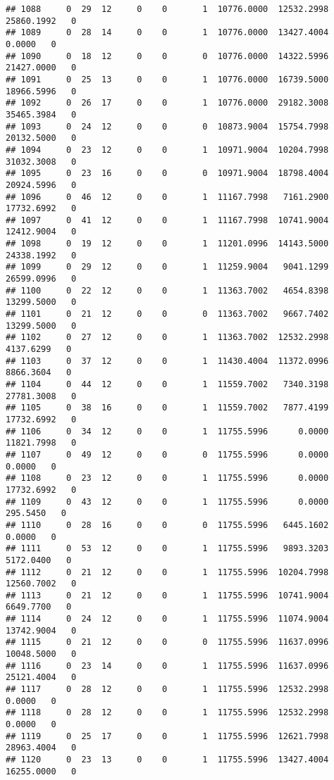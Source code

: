\documentclass[
]{article}
\begin{document}
\begin{enumerate}
\begin{verbatim}
## 1088     0  29  12     0    0       1  10776.0000  12532.2998  25860.1992   0
## 1089     0  28  14     0    0       1  10776.0000  13427.4004      0.0000   0
## 1090     0  18  12     0    0       0  10776.0000  14322.5996  21427.0000   0
## 1091     0  25  13     0    0       1  10776.0000  16739.5000  18966.5996   0
## 1092     0  26  17     0    0       1  10776.0000  29182.3008  35465.3984   0
## 1093     0  24  12     0    0       0  10873.9004  15754.7998  20132.5000   0
## 1094     0  23  12     0    0       1  10971.9004  10204.7998  31032.3008   0
## 1095     0  23  16     0    0       0  10971.9004  18798.4004  20924.5996   0
## 1096     0  46  12     0    0       1  11167.7998   7161.2900  17732.6992   0
## 1097     0  41  12     0    0       1  11167.7998  10741.9004  12412.9004   0
## 1098     0  19  12     0    0       1  11201.0996  14143.5000  24338.1992   0
## 1099     0  29  12     0    0       1  11259.9004   9041.1299  26599.0996   0
## 1100     0  22  12     0    0       1  11363.7002   4654.8398  13299.5000   0
## 1101     0  21  12     0    0       0  11363.7002   9667.7402  13299.5000   0
## 1102     0  27  12     0    0       1  11363.7002  12532.2998   4137.6299   0
## 1103     0  37  12     0    0       1  11430.4004  11372.0996   8866.3604   0
## 1104     0  44  12     0    0       1  11559.7002   7340.3198  27781.3008   0
## 1105     0  38  16     0    0       1  11559.7002   7877.4199  17732.6992   0
## 1106     0  34  12     0    0       1  11755.5996      0.0000  11821.7998   0
## 1107     0  49  12     0    0       0  11755.5996      0.0000      0.0000   0
## 1108     0  23  12     0    0       1  11755.5996      0.0000  17732.6992   0
## 1109     0  43  12     0    0       1  11755.5996      0.0000    295.5450   0
## 1110     0  28  16     0    0       0  11755.5996   6445.1602      0.0000   0
## 1111     0  53  12     0    0       1  11755.5996   9893.3203   5172.0400   0
## 1112     0  21  12     0    0       1  11755.5996  10204.7998  12560.7002   0
## 1113     0  21  12     0    0       1  11755.5996  10741.9004   6649.7700   0
## 1114     0  24  12     0    0       1  11755.5996  11074.9004  13742.9004   0
## 1115     0  21  12     0    0       0  11755.5996  11637.0996  10048.5000   0
## 1116     0  23  14     0    0       1  11755.5996  11637.0996  25121.4004   0
## 1117     0  28  12     0    0       1  11755.5996  12532.2998      0.0000   0
## 1118     0  28  12     0    0       1  11755.5996  12532.2998      0.0000   0
## 1119     0  25  17     0    0       1  11755.5996  12621.7998  28963.4004   0
## 1120     0  23  13     0    0       1  11755.5996  13427.4004  16255.0000   0

\end{verbatim}
\end{enumerate}
\end{document}
